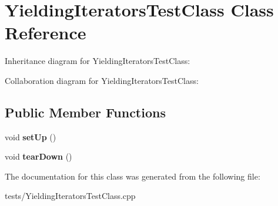 \hypertarget{classYieldingIteratorsTestClass}{}\section{Yielding\+Iterators\+Test\+Class Class Reference}
\label{classYieldingIteratorsTestClass}


Inheritance diagram for Yielding\+Iterators\+Test\+Class\+:


Collaboration diagram for Yielding\+Iterators\+Test\+Class\+:
\subsection*{Public Member Functions}
\begin{DoxyCompactItemize}
\item 
\mbox{\label{classYieldingIteratorsTestClass_aea750bff157ab514cbd36aac54528aaf}} 
void {\bfseries set\+Up} ()
\item 
\mbox{\label{classYieldingIteratorsTestClass_aba4d2c856cf59896c04804a12ab802d7}} 
void {\bfseries tear\+Down} ()
\end{DoxyCompactItemize}


The documentation for this class was generated from the following file\+:\begin{DoxyCompactItemize}
\item 
tests/Yielding\+Iterators\+Test\+Class.\+cpp\end{DoxyCompactItemize}
